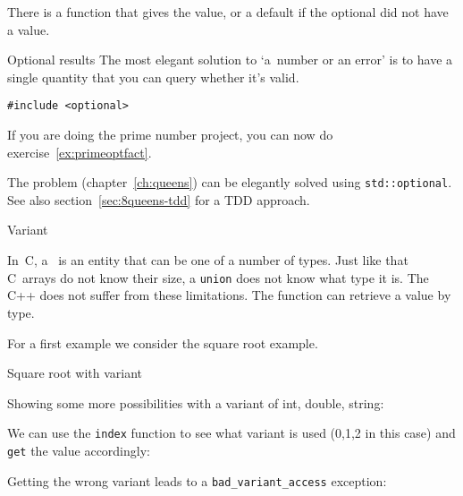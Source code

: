 There is a function  that gives the value, or
a default if the optional did not have a value.

\begin{slide}{Optional results}
  \label{sl:optional-root}
  The most elegant solution to `a~number or an error' is to have a
  single quantity that you can query whether it's valid.
\begin{lstlisting}
#include <optional>
\end{lstlisting}
\end{slide}

\begin{exercise}
  If you are doing the prime number project,
  you can now do exercise~\ref{ex:primeoptfact}.
\end{exercise}

\begin{exercise}
  The  problem (chapter~\ref{ch:queens})
  can be elegantly solved using \lstinline+std::optional+.
  See also section~\ref{sec:8queens-tdd} for a \ac{TDD} approach.
\end{exercise}

 {Variant}
\label{sec:stl-variant}

In~C, a~ is an entity that can be one of a number
of types. Just like that C~arrays do not know their size, a
\lstinline{union} does not know what type it is. The C++
 does not suffer from these limitations. The
function  can retrieve a value by type.

For a first example we consider the square root example.

\begin{block}{Square root with variant}
  \label{sl:root-variant}
  \begin{multicols}{2}
    \columnbreak
  \end{multicols}
\end{block}

Showing some more possibilities with a variant of int, double, string:

We can use the \lstinline{index} function to see what variant is used
(0,1,2 in this case)
and \lstinline{get} the value accordingly:

Getting the wrong variant leads to a \lstinline{bad_variant_access} exception:

